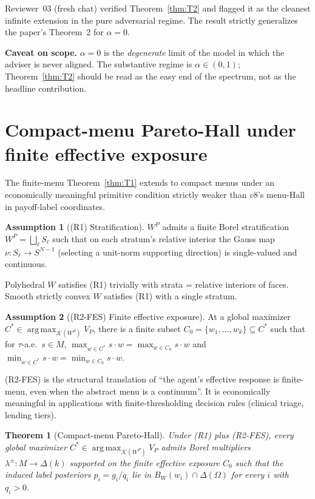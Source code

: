 \documentclass[11pt]{article}
\newtheorem{theorem}{Theorem}
\theoremstyle{definition}
\newtheorem{assumption}{Assumption}
\theoremstyle{remark}
\newcommand{\Om}{\Omega}
\newcommand{\argmax}{\operatorname*{arg\,max}}
\newcommand{\K}{\mathcal{K}}
\begin{document}
\noindent Reviewer~03 (fresh chat) verified Theorem~\ref{thm:T2} and
flagged it as the cleanest infinite extension in the pure adversarial
regime. The result strictly generalizes the paper's Theorem~2 for
$\alpha=0$.

\noindent\textbf{Caveat on scope.} $\alpha=0$ is the \emph{degenerate}
limit of the model in which the adviser is never aligned. The
substantive regime is $\alpha\in(0,1)$; Theorem~\ref{thm:T2} should be
read as the easy end of the spectrum, not as the headline contribution.

\section{Compact-menu Pareto-Hall under finite effective exposure}\label{sec:t4}

The finite-menu Theorem~\ref{thm:T1} extends to compact menus under an
economically meaningful primitive condition strictly weaker than $v8$'s
menu-Hall in payoff-label coordinates.

\begin{assumption}[(R1) Stratification]\label{ass:R1}
$W^P$ admits a finite Borel stratification $W^P = \bigsqcup_\ell S_\ell$
such that on each stratum's relative interior the Gauss map
$\nu:S_\ell\to S^{N-1}$ (selecting a unit-norm supporting direction) is
single-valued and continuous.
\end{assumption}

\noindent Polyhedral $W$ satisfies (R1) trivially with strata =
relative interiors of faces. Smooth strictly convex $W$ satisfies (R1)
with a single stratum.

\begin{assumption}[(R2-FES) Finite effective exposure]\label{ass:R2}
At a global maximizer $C^*\in\argmax_{\K(W^P)}V_P$, there is a finite
subset $C_0 = \{w_1,\ldots,w_k\}\subseteq C^*$ such that for $\tau$-a.e.\ $s\in M$,
$\max_{w\in C^*}s\!\cdot w = \max_{w\in C_0}s\!\cdot w$ and
$\min_{w\in C^*}s\!\cdot w = \min_{w\in C_0}s\!\cdot w$.
\end{assumption}

\noindent (R2-FES) is the structural translation of ``the agent's
effective response is finite-menu, even when the abstract menu is a
continuum''. It is economically meaningful in applications with
finite-thresholding decision rules (clinical triage, lending tiers).

\begin{theorem}[Compact-menu Pareto-Hall]\label{thm:T4}
Under (R1) plus (R2-FES), every global maximizer $C^*\in\argmax_{\K(W^P)}V_P$
admits Borel multipliers $\lambda^\pm:M\to\Delta(k)$ supported on the
finite effective exposure $C_0$ such that the induced label posteriors
$p_i = g_i/q_i$ lie in $B_W(w_i)\cap\Delta(\Om)$ for every $i$ with $q_i>0$.
\end{theorem}
\end{document}
